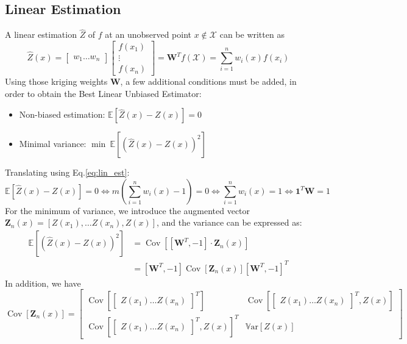\documentclass[a4paper,11pt]{article}
\newcommand{\Var}{\mathbb{V}\text{ar}}
\newcommand{\Ex}{\mathbb{E}}
\DeclareMathOperator{\Cov}{\mathrm{Cov}}
\begin{document}
\subsection{Linear Estimation}
\label{sec:linear_estimation}
A linear estimation $\hat{Z}$ of $f$ at an unobserved point $x\notin \mathcal{X}$ can be written as
\begin{equation}
  \label{eq:lin_est}
  \hat{Z}(x) =
  \begin{bmatrix}
    w_1 \dots w_n
    \end{bmatrix}
    \begin{bmatrix}
      f(x_1) \\ \vdots \\ f(x_n)
    \end{bmatrix} = \mathbf{W}^Tf(\mathcal{X}) = \sum_{i=1}^n w_i(x) f(x_i)
\end{equation}
Using those kriging weights $\mathbf{W}$, a few additional conditions must be added, in order to obtain the Best Linear Unbiased Estimator:
\begin{itemize}
\item Non-biased estimation: $\Ex[\hat{Z}(x) - Z(x)]=0$
\item Minimal variance: $\min~\Ex[(\hat{Z}(x) - Z(x))^2]$
\end{itemize}
Translating using Eq.\eqref{eq:lin_est}:
\begin{equation}
  \Ex[\hat{Z}(x) - Z(x)]=0 \iff m(\sum_{i=1}^n w_i(x)-1) = 0 \iff \sum_{i=1}^n w_i(x) = 1 \iff \mathbf{1}^T \mathbf{W} = 1
\end{equation}
For the minimum of variance, we introduce the augmented vector $\mathbf{Z}_n(x) = [Z(x_1),\dots Z(x_n), Z(x)]$, and
the variance can be expressed as:
\begin{align}
  \Ex[(\hat{Z}(x) - Z(x))^2] &= \Cov\left[[\mathbf{W}^T, -1] \cdot \mathbf{Z}_n(x) \right] \\
                             &= [\mathbf{W}^T, -1] \Cov\left[\mathbf{Z}_n(x) \right] [\mathbf{W}^T, -1]^T
\end{align}
In addition, we have
\begin{equation}
  \Cov\left[\mathbf{Z}_n(x) \right] =
  \begin{bmatrix}
    \Cov\left[
      \begin{bmatrix}
        Z(x_1) \dots Z(x_n)
      \end{bmatrix}^T\right]
    & \Cov\left[
      \begin{bmatrix}
        Z(x_1) \dots Z(x_n)
      \end{bmatrix}^T, Z(x) \right]
  \\
  \Cov\left[
    \begin{bmatrix}
      Z(x_1) \dots Z(x_n)
    \end{bmatrix}^T, Z(x) \right]^T & \Var\left[Z(x)\right]
  \end{bmatrix}
\end{equation}
\end{document}
